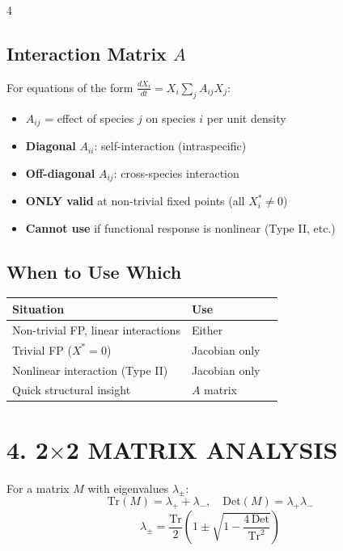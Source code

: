 \documentclass[8pt,landscape]{article}
\begin{document}
\begin{multicols}{4}
\subsection{Interaction Matrix $A$}
For equations of the form $\frac{dX_i}{dt} = X_i \sum_j A_{ij} X_j$:
\begin{itemize}
  \item $A_{ij}$ = effect of species $j$ on species $i$ per unit density
  \item \textbf{Diagonal} $A_{ii}$: self-interaction (intraspecific)
  \item \textbf{Off-diagonal} $A_{ij}$: cross-species interaction
  \item \textbf{ONLY valid} at non-trivial fixed points (all $X_i^* \neq 0$)
  \item \textbf{Cannot use} if functional response is nonlinear (Type II, etc.)
\end{itemize}

\subsection{When to Use Which}
\begin{tabular}{lll}
\toprule
Situation & Use \\ \midrule
Non-trivial FP, linear interactions & Either \\
Trivial FP ($X^*=0$) & Jacobian only \\
Nonlinear interaction (Type II) & Jacobian only \\
Quick structural insight & $A$ matrix \\
\bottomrule
\end{tabular}

\section{4. 2$\times$2 MATRIX ANALYSIS}

For a matrix $M$ with eigenvalues $\lambda_\pm$:
\[
\text{Tr}(M) = \lambda_+ + \lambda_-, \quad \text{Det}(M) = \lambda_+ \lambda_-
\]
\[
\lambda_\pm = \frac{\text{Tr}}{2}\left(1 \pm \sqrt{1 - \frac{4\,\text{Det}}{\text{Tr}^2}}\right)
\]


\end{multicols}
\end{document}
